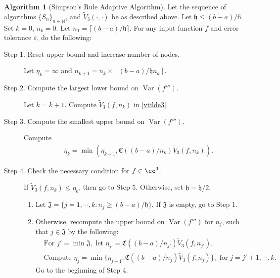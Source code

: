 \documentclass{iitthesis}
\DeclareMathOperator{\Var}{Var}
\theoremstyle{definition}
\newtheorem{algo}{Algorithm}
\theoremstyle{remark}
\begin{document}
\begin{algo} [Simpson's Rule Adaptive Algorithm] \label{multistageintegalgosimpson}
Let the sequence of algorithms $\{S_n\}_{n\in \mathbb{N}}$, %
and $\widetilde{V}_3(\cdot,\cdot)$ be as described above.
Let $\mathfrak{h}\le (b-a)/6$. Set $k=0$, $n_{k}=0$. Let $n_1=\lceil(b-a)/\mathfrak{h}\rceil$. For any input function $f$ and error tolerance $\varepsilon$, do the following: %
\begin{description}
\item[Step 1. Reset upper bound and increase number of nodes.] Let $\eta_{k}=\infty$ and $n_{k+1}=n_k\times\left\lceil(b-a)/\mathfrak{h}n_{k}\right\rceil$.

\item[Step 2. Compute the largest lower bound on {$\Var(f''')$}.] Let $k=k+1$. Compute  $\widetilde{V}_3(f,n_k)$ in \eqref{vtilde3}.%

\item[Step 3. Compute the smallest upper bound on {$\Var(f''')$}.] Compute
    \begin{align*}
        \eta_{k}=\min\left(\eta_{k-1},\mathfrak{C}((b-a)/n_{k})\widetilde{V}_3(f,n_k)\right).
    \end{align*}

\item[Step 4. Check the necessary condition for $f \in \cc^3$.] If $\widetilde{V}_3(f,n_k) \le \eta_{k}$, then go to Step 5.
  Otherwise, set $\mathfrak{h} = \mathfrak{h}/2$.
    \begin{enumerate}[label=\alph*)]
      \item Let $\mathfrak{J}=\{j=1, \cdots, k: n_{j}\ge (b-a)/\mathfrak{h}\}$. If $\mathfrak{J}$ is empty, go to Step 1.
      \item Otherwise, recompute the upper bound on $\Var(f''')$ for $n_{j}$, such that $j \in \mathfrak{J}$ by the following:
      \begin{align*}
        &\text{For } j'=\min\mathfrak{J}, \text{ let } \eta_{j'}=\mathfrak{C}((b-a)/n_{j'})\widetilde{V}_3(f,n_{j'}), \\
        &\text{Compute } \eta_{j}=\min\{\eta_{j-1},\mathfrak{C}((b-a)/n_{j})\widetilde{V}_3(f,n_{j})\}, \text{ for } j=j'+1, \cdots, k.
      \end{align*}
      Go to the beginning of Step 4.
    \end{enumerate}



\end{description}
\end{algo}
\end{document}
